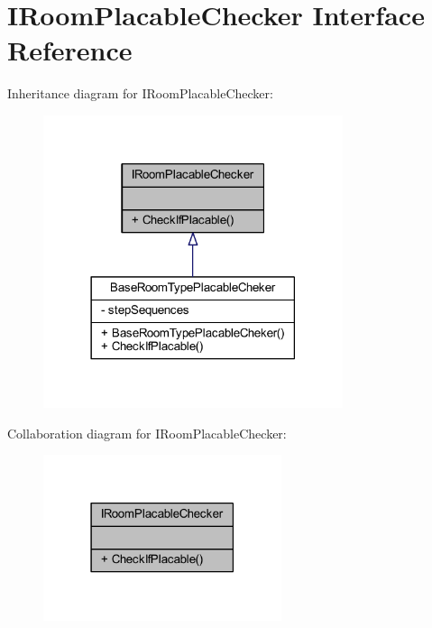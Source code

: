 \hypertarget{interface_i_room_placable_checker}{}\section{I\+Room\+Placable\+Checker Interface Reference}
\label{interface_i_room_placable_checker}


Inheritance diagram for I\+Room\+Placable\+Checker\+:\nopagebreak
\begin{figure}[H]
\begin{center}
\leavevmode
\includegraphics[width=249pt]{interface_i_room_placable_checker__inherit__graph}
\end{center}
\end{figure}


Collaboration diagram for I\+Room\+Placable\+Checker\+:\nopagebreak
\begin{figure}[H]
\begin{center}
\leavevmode
\includegraphics[width=198pt]{interface_i_room_placable_checker__coll__graph}
\end{center}
\end{figure}
